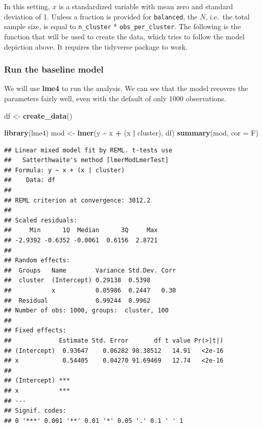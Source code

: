 \documentclass[
  12pt,
]{book}
\newenvironment{Shaded}{\begin{snugshade}}{\end{snugshade}}
\newcommand{\DataTypeTok}[1]{\textcolor[rgb]{0.13,0.29,0.53}{#1}}
\newcommand{\KeywordTok}[1]{\textcolor[rgb]{0.13,0.29,0.53}{\textbf{#1}}}
\newcommand{\NormalTok}[1]{#1}
\newcommand{\OperatorTok}[1]{\textcolor[rgb]{0.81,0.36,0.00}{\textbf{#1}}}
\newcommand{\StringTok}[1]{\textcolor[rgb]{0.31,0.60,0.02}{#1}}
\begin{document}
In this setting, \(x\) is a standardized variable with mean zero and standard deviation of 1. Unless a fraction is provided for \texttt{balanced}, the \(N\), i.e.~the total sample size, is equal to \texttt{n\_cluster} * \texttt{obs\_per\_cluster}. The following is the function that will be used to create the data, which tries to follow the model depiction above. It requires the tidyverse package to work.

\hypertarget{run-the-baseline-model}{%
\subsubsection{Run the baseline model}\label{run-the-baseline-model}}

We will use \textbf{lme4} to run the analysis. We can see that the model recovers the parameters fairly well, even with the default of only 1000 observations.

\begin{Shaded}
\begin{Highlighting}[]
\NormalTok{df \textless{}{-}}\StringTok{ }\KeywordTok{create\_data}\NormalTok{()}

\KeywordTok{library}\NormalTok{(lme4)}
\NormalTok{mod \textless{}{-}}\StringTok{ }\KeywordTok{lmer}\NormalTok{(y }\OperatorTok{\textasciitilde{}}\StringTok{ }\NormalTok{x }\OperatorTok{+}\StringTok{ }\NormalTok{(x }\OperatorTok{|}\StringTok{ }\NormalTok{cluster), df)}
\KeywordTok{summary}\NormalTok{(mod, }\DataTypeTok{cor =}\NormalTok{ F)}
\end{Highlighting}
\end{Shaded}

\begin{verbatim}
## Linear mixed model fit by REML. t-tests use
##   Satterthwaite's method [lmerModLmerTest]
## Formula: y ~ x + (x | cluster)
##    Data: df
## 
## REML criterion at convergence: 3012.2
## 
## Scaled residuals: 
##     Min      1Q  Median      3Q     Max 
## -2.9392 -0.6352 -0.0061  0.6156  2.8721 
## 
## Random effects:
##  Groups   Name        Variance Std.Dev. Corr
##  cluster  (Intercept) 0.29138  0.5398       
##           x           0.05986  0.2447   0.30
##  Residual             0.99244  0.9962       
## Number of obs: 1000, groups:  cluster, 100
## 
## Fixed effects:
##             Estimate Std. Error       df t value Pr(>|t|)
## (Intercept)  0.93647    0.06282 98.38512   14.91   <2e-16
## x            0.54405    0.04270 91.69469   12.74   <2e-16
##                
## (Intercept) ***
## x           ***
## ---
## Signif. codes:  
## 0 '***' 0.001 '**' 0.01 '*' 0.05 '.' 0.1 ' ' 1
\end{verbatim}
\end{document}
